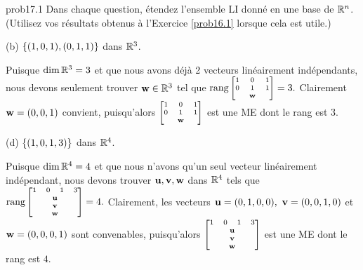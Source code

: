\begin{sol}{prob17.1} Dans chaque question, étendez l'ensemble LI donné en une base de $\mathbb{R}^n$.  (Utilisez vos résultats obtenus à l'Exercice \ref{prob16.1} lorsque cela est utile.)
\medskip

(b) $\{(1, 0,1), (0,1,1)\}$ dans $\mathbb{R}^3$.

\soln Puisque $\dim \mathbb{R}^3=3$ et que nous avons déjà 2 vecteurs linéairement indépendants, nous devons seulement trouver $\mathbf{w}\in \mathbb{R}^3$ tel que $\rank \scriptsize\bmatrix 1& 0&1\\
0&1&1\\&\ww\endbmatrix=3.$ Clairement $\mathbf{w}=(0,0,1)$ convient, puisqu'alors $\scriptsize\bmatrix 1& 0&1\\
0&1&1\\&\ww\endbmatrix$ est une ME dont le rang est  $3$. 
\medskip

(d) $\{(1, 0, 1, 3)\}$ dans $\mathbb{R}^4$.

\soln Puisque $\dim \mathbb{R}^4=4$ et que nous n'avons qu'un seul vecteur linéairement indépendant, nous devons trouver $\mathbf{u},\mathbf{v},\mathbf{w}$ dans $\mathbb{R}^4$ tels que $\rank \scriptsize\bmatrix 1&0&1&3\\
&&\hspace{-0.5cm}\uu\\ &&\hspace{-0.5cm}\vv\\&&\hspace{-0.5cm}\ww\endbmatrix=4.$ Clairement, les vecteurs $\uu=(0,1,0,0),\ \vv=(0,0,1,0)$ et $\mathbf{w}=(0,0,0,1)$ sont convenables, puisqu'alors $\scriptsize\bmatrix 1&0&1&3\\
&&\hspace{-0.5cm}\uu\\ &&\hspace{-0.5cm}\vv\\&&\hspace{-0.5cm}\ww\endbmatrix$ est une ME dont le rang est $4$.
\medskip


\end{sol}